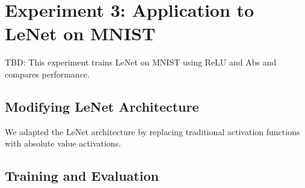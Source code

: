 
\section{Experiment 3: Application to LeNet on MNIST}
\label{sec:experiment3}

TBD: This experiment trains LeNet on MNIST using ReLU and Abs and compares performance.

\subsection{Modifying LeNet Architecture}

We adapted the LeNet architecture by replacing traditional activation functions with absolute value activations.


\subsection{Training and Evaluation}


